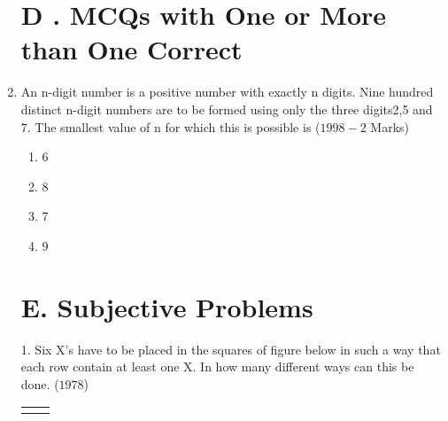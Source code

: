 \documentclass[journal,12pt,twocolumn]{IEEEtran}
\theoremstyle{remark}
\begin{document}
\begin{enumerate}[start=3]
\section*{D . MCQs with One or More than One Correct}
\item An n-digit number is a positive number with exactly n digits. Nine hundred distinct n-digit numbers are to be formed using only the three digits2,5 and 7. The smallest value of n for which  this is possible is
\hfill{($1998-2$ Marks)}\\
\begin{multicols}{2} 
\begin{enumerate}[label=, left=0pt, labelsep=0pt, itemsep=1em]
\item 6\item  8\columnbreak\item 7\item 9\\
\end{enumerate}
\end{multicols}
 \section*{E. Subjective Problems}   
\item[1.]Six X's have to be placed in the squares of figure below in such a way that each row contain at least one X. In how many different ways can this be done.
\hfill{($1978$)}\\
\begin{center}
\begin{tabular}{|c|c|}
\hline
\quad&\quad  \\
\end{tabular}
\end{center}
\begin{center}
\begin{tabular}{|c|c|c|c|}
\hline
    \quad&\quad&\quad &\quad\\
    \hline
\end{tabular}
\end{center}
\begin{center}
\begin{tabular}{|c|c|}
   \quad& \quad\\
   \hline
\end{tabular}\\
\end{center}
\end{enumerate}
\end{document}
